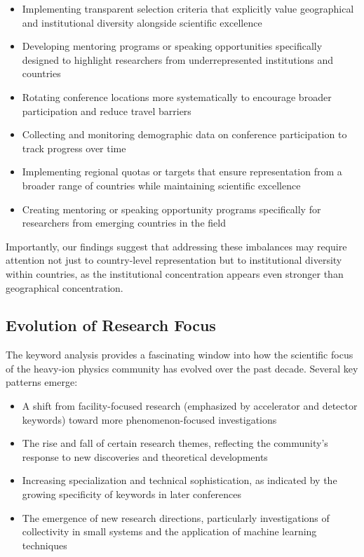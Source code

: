 \documentclass[a4paper,11pt]{article}
\begin{document}
\begin{itemize}
    \item Implementing transparent selection criteria that explicitly value geographical and institutional diversity alongside scientific excellence
    \item Developing mentoring programs or speaking opportunities specifically designed to highlight researchers from underrepresented institutions and countries
    \item Rotating conference locations more systematically to encourage broader participation and reduce travel barriers
    \item Collecting and monitoring demographic data on conference participation to track progress over time
    \item Implementing regional quotas or targets that ensure representation from a broader range of countries while maintaining scientific excellence
    \item Creating mentoring or speaking opportunity programs specifically for researchers from emerging countries in the field
\end{itemize}

Importantly, our findings suggest that addressing these imbalances may require attention not just to country-level representation but to institutional diversity within countries, as the institutional concentration appears even stronger than geographical concentration.

\subsection{Evolution of Research Focus}

The keyword analysis provides a fascinating window into how the scientific focus of the heavy-ion physics community has evolved over the past decade. Several key patterns emerge:

\begin{itemize}
    \item A shift from facility-focused research (emphasized by accelerator and detector keywords) toward more phenomenon-focused investigations
    \item The rise and fall of certain research themes, reflecting the community's response to new discoveries and theoretical developments
    \item Increasing specialization and technical sophistication, as indicated by the growing specificity of keywords in later conferences
    \item The emergence of new research directions, particularly investigations of collectivity in small systems and the application of machine learning techniques
\end{itemize}
\end{document}
